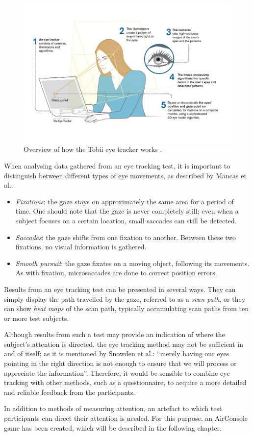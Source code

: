 \begin{figure}[h!]
	\centering
	\includegraphics[width=\textwidth]{figures/tobii.jpg}
	\caption{Overview of how the Tobii eye tracker works \cite{TobiiPro}.\label{fig:tobii}}
\end{figure}

When analysing data gathered from an eye tracking test, it is important to distinguish between different types of eye movements, as described by Mancas et al.:

\begin{itemize}
\item \textit{Fixations}: the gaze stays on approximately the same area for a period of time. One should note that the gaze is never completely still; even when a subject focuses on a certain location, small saccades can still be detected.
\item \textit{Saccades}: the gaze shifts from one fixation to another. Between these two fixations, no visual information is gathered.
\item \textit{Smooth pursuit}: the gaze fixates on a moving object, following its movements. As with fixation, microsaccades are done to correct position errors.
\end{itemize}

Results from an eye tracking test can be presented in several ways. They can simply display the path travelled by the gaze, referred to as a \textit{scan path}, or they can show \textit{heat maps} of the scan path, typically accumulating scan paths from ten or more test subjects. 

Although results from such a test may provide an indication of where the subject’s attention is directed, the eye tracking method may not be sufficient in and of itself; as it is mentioned by Snowden et al.\cite{snowden2012basic}: “merely having our eyes pointing in the right direction is not enough to ensure that we will process or appreciate the information”. Therefore, it would be sensible to combine eye tracking with other methods, such as a questionnaire, to acquire a more detailed and reliable feedback from the participants.

In addition to methods of measuring attention, an artefact to which test participants can direct their attention is needed. For this purpose, an AirConsole game has been created, which will be described in the following chapter.